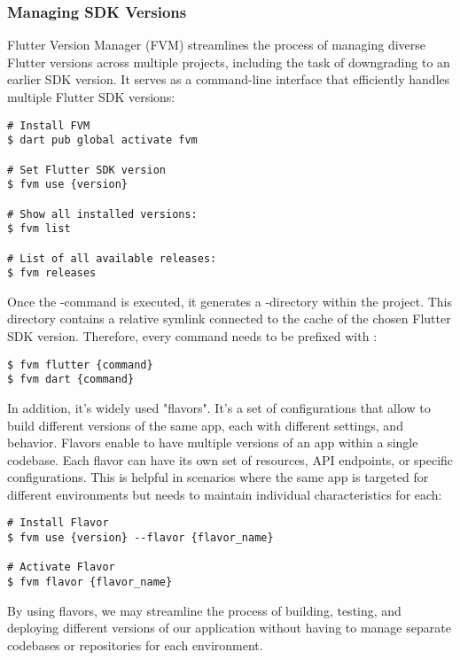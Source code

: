 \newpage
\subsubsection{Managing SDK Versions}

Flutter Version Manager (FVM) streamlines the process of managing diverse Flutter versions across multiple projects, 
including the task of downgrading to an earlier SDK version. It serves as a command-line interface that efficiently 
handles multiple Flutter SDK versions:

\begin{lstlisting}[language=terminal]
# Install FVM 
$ dart pub global activate fvm

# Set Flutter SDK version
$ fvm use {version}

# Show all installed versions:
$ fvm list

# List of all available releases: 
$ fvm releases
\end{lstlisting}

\noindent Once the -command is executed, it generates a -directory within the project. This directory 
contains a relative symlink connected to the cache of the chosen Flutter SDK version. Therefore, every command needs to 
be prefixed with :

\begin{lstlisting}[language=terminal]
$ fvm flutter {command}
$ fvm dart {command}
\end{lstlisting}

\noindent In addition, it's widely used "flavors". It's a set of configurations that allow to build different versions
of the same app, each with different settings, and behavior. Flavors enable to have multiple versions of an app within 
a single codebase. Each flavor can have its own set of resources, API endpoints, or specific configurations. This is 
helpful in scenarios where the same app is targeted for different environments but needs to maintain individual 
characteristics for each:

\begin{lstlisting}[language=terminal]
# Install Flavor
$ fvm use {version} --flavor {flavor_name}

# Activate Flavor
$ fvm flavor {flavor_name}
\end{lstlisting}

\noindent By using flavors, we may streamline the process of building, testing, and deploying different versions of 
our application without having to manage separate codebases or repositories for each environment.


